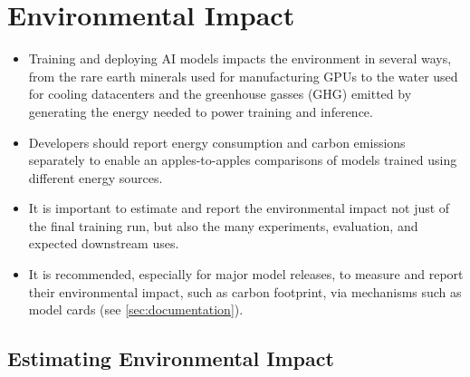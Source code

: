 \section{Environmental Impact}
\label{sec:environmental-impact}
\vspace{-2mm}

\begin{tcolorbox}[
    width=\textwidth,
    title={Environmental Impact Best Practices},
    colback=backgroundcol, %
    colframe=darkgray, %
    colbacktitle=dataprep, %
    coltitle=white, %
    coltext=black %
]
\begin{itemize}[itemsep=0pt, wide=3pt]
    \item Training and deploying AI models impacts the environment in several ways, from the rare earth minerals used for manufacturing GPUs to the water used for cooling datacenters and the greenhouse gasses (GHG) emitted by generating the energy needed to power training and inference.
    \item Developers should report energy consumption and carbon emissions separately to enable an apples-to-apples comparisons of models trained using different energy sources.
    \item It is important to estimate and report the environmental impact not just of the final training run, but also the many experiments, evaluation, and expected downstream uses.
    \item It is recommended, especially for major model releases, to measure and report their environmental impact, such as carbon footprint, via mechanisms such as model cards (see \cref{sec:documentation}).
\end{itemize}

\end{tcolorbox}


\subsection{Estimating Environmental Impact}
\vspace{-2mm}

